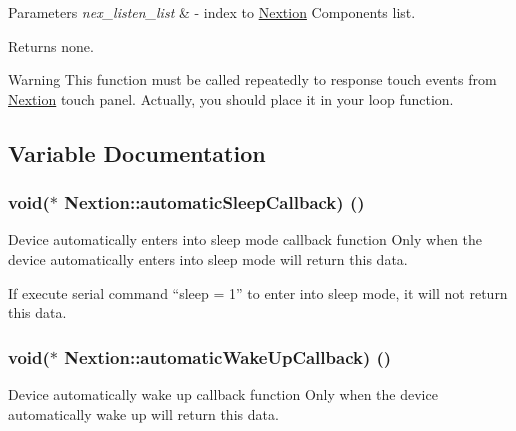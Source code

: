 \begin{DoxyParams}{Parameters}
{\em nex\+\_\+listen\+\_\+list} & -\/ index to \hyperlink{class_nextion}{Nextion} Components list. \\
\hline
\end{DoxyParams}
\begin{DoxyReturn}{Returns}
none.
\end{DoxyReturn}
\begin{DoxyWarning}{Warning}
This function must be called repeatedly to response touch events from \hyperlink{class_nextion}{Nextion} touch panel. Actually, you should place it in your loop function. 
\end{DoxyWarning}


\subsection{Variable Documentation}
\hypertarget{group___core_a_p_i_gaf2a0f9a92270df75c04f2ade7736732f}{}
\subsubsection[{automatic\+Sleep\+Callback}]{\setlength{\rightskip}{0pt plus 5cm}void($\ast$ Nextion\+::automatic\+Sleep\+Callback) ()}\label{group___core_a_p_i_gaf2a0f9a92270df75c04f2ade7736732f}


Device automatically enters into sleep mode callback function Only when the device automatically enters into sleep mode will return this data. 

If execute serial command “sleep = 1” to enter into sleep mode, it will not return this data. \hypertarget{group___core_a_p_i_ga5191ad9e56527106cda76c6879043a08}{}
\subsubsection[{automatic\+Wake\+Up\+Callback}]{\setlength{\rightskip}{0pt plus 5cm}void($\ast$ Nextion\+::automatic\+Wake\+Up\+Callback) ()}\label{group___core_a_p_i_ga5191ad9e56527106cda76c6879043a08}


Device automatically wake up callback function Only when the device automatically wake up will return this data. 

